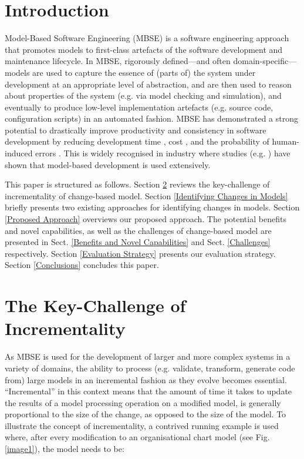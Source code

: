 \documentclass{llncs}
\begin{document}
\section{Introduction}
\label{Introduction}
Model-Based Software Engineering (MBSE) is a software engineering approach that promotes models to first-class artefacts of the software development and maintenance lifecycle. In MBSE, rigorously defined---and often domain-specific---models are used to capture the essence of (parts of) the system under development at an appropriate level of abstraction, and are then used to reason about properties of the system (e.g. via model checking and simulation), and eventually to produce low-level implementation artefacts (e.g. source code, configuration scripts) in an automated fashion. MBSE has demonstrated a strong potential to drastically improve productivity and consistency in software development by reducing development time \cite{jaaksi2002developing}, cost \cite{davies2014model}, and the probability of human-induced errors \cite{mohagheghi2013empirical}. This is widely recognised in industry where studies (e.g. \cite{liebel2014assessing, hutchinson2011empirical}) have shown that model-based development is used extensively.

This paper is structured as follows. Section \ref{The Key-Challenge of Incrementality} reviews the key-challenge of incrementality of change-based model. Section \ref{Identifying Changes in Models} briefly presents two existing approaches for identifying changes in models. Section \ref{Proposed Approach} overviews our proposed approach. The potential benefits and novel capabilities, as well as the challenges of change-based model are presented in Sect. \ref{Benefits and Novel Capabilities} and Sect. \ref{Challenges} respectively. Section \ref{Evaluation Strategy} presents our evaluation strategy. Section \ref{Conclusions} concludes this paper.

\section{The Key-Challenge of Incrementality}
\label{The Key-Challenge of Incrementality}
As MBSE is used for the development of larger and more complex systems in a variety of domains, the ability to process (e.g. validate, transform, generate code from) large models in an incremental fashion as they evolve becomes essential. ``Incremental'' in this context means that the amount of time it takes to update the results of a model processing operation on a modified model, is generally proportional to the size of the change, as opposed to the size of the model. To illustrate the concept of incrementality, a contrived running example is used where, after every modification to an organisational chart model (see Fig. \ref{image1}), the model needs to be:
\end{document}
